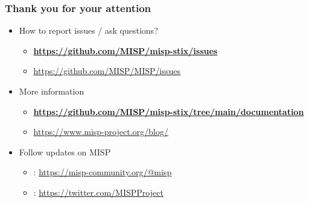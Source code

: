 \begin{frame}
    \frametitle{Thank you for your attention}
    \begin{itemize}
        \item How to report issues / ask questions?
        \begin{itemize}
            \item {\bf\url{https://github.com/MISP/misp-stix/issues}}
            \item {\url{https://github.com/MISP/MISP/issues}}
        \end{itemize}
        \item More information
        \begin{itemize}
            \item {\bf\url{https://github.com/MISP/misp-stix/tree/main/documentation}}
            \item \url{https://www.misp-project.org/blog/}
        \end{itemize}
        \item Follow updates on MISP
        \begin{itemize}
            \item \faMastodon : \url{https://misp-community.org/@misp}
            \item \faTwitter : \url{https://twitter.com/MISPProject}
        \end{itemize}
    \end{itemize}
\end{frame}
